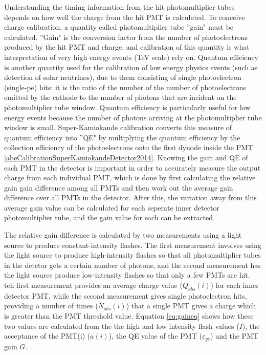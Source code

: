 Understanding the timing information from the hit photomultiplier tubes depends on how well the charge from the hit PMT is calculated. To conceive charge calibration, a quantity called photomultiplier tube ''gain" must be calculated. ''Gain" is the conversion factor from the number of photoelectrons produced by the hit PMT and charge, and calibration of this quantity is what interpretation of very high energy events (TeV scale) rely on. Quantum efficiency is another quantity used for the calibration of low energy physics events (such as detection of solar neutrinos), due to them consisting of single photoelectron (single-pe) hits: it is the ratio of the number of the number of photoelectrons emitted by the cathode to the number of photons that are incident on the photomultiplier tube window. Quantum efficiency is particularly useful for low energy events because the number of photons arriving at the photomultiplier tube window is small. Super-Kamiokande calibration converts this measure of quantum efficiency into ''QE" by multiplying the quantum efficiency by the collection efficiency of the photoelectrons onto the first dynode inside the PMT \ref{abeCalibrationSuperKamiokandeDetector2014}. Knowing the gain and QE of each PMT in the detector is important in order to accurately measure the output charge from each individual PMT, which is done by first calculating the relative gain gain difference among all PMTs and then work out the average gain difference over all PMTs in the detector. After this, the variation away from this average gain value can be calculated for each seperate inner detector photomultiplier tube, and the gain value for each can be extracted. 

The relative gain difference is calculated by two measurements using a light source to produce constant-intensity flashes. The first measurement involves using the light source to produce high-intensity flashes so that all photomultiplier tubes in the detctor gets a certain number of photons, and the second measurement has the light source produce low-intensity flashes so that only a few PMTs are hit. teh first measurement provides an average charge value ($Q_{o b s}(i)$) for each inner detector PMT, while the second measurement gives single photoelectron hits, providing a number of times ($N_{o b s}(i)$) that a single PMT gives a charge which is greater than the PMT threshold value. Equation \ref{eq:gaineq} shows how these two values are calculated from the the high and low intensity flash values ($I$), the acceptance of the PMT(i) ($a(i)$), the QE value of the PMT ($\varepsilon_{q e}$) and the PMT gain $G$. 

